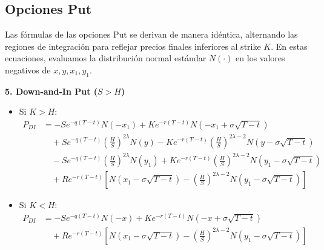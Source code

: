 \subsection{Opciones Put}

Las fórmulas de las opciones Put se derivan de manera idéntica, alternando las regiones de integración para reflejar precios finales inferiores al strike $K$. En estas ecuaciones, evaluamos la distribución normal estándar $N(\cdot)$ en los valores negativos de $x, y, x_1, y_1$.

\textbf{5. Down-and-In Put ($S > H$)}
\begin{itemize}
    \item Si $K > H$:
    \begin{align*}
    P_{DI} &= -S e^{-q(T-t)} N(-x_1) + K e^{-r(T-t)} N(-x_1 + \sigma\sqrt{T-t}) \\
    &\quad + S e^{-q(T-t)} \left(\frac{H}{S}\right)^{2\lambda} N(y) - K e^{-r(T-t)}\left(\frac{H}{S}\right)^{2\lambda - 2} N(y - \sigma\sqrt{T-t}) \\
    &\quad - S e^{-q(T-t)} \left(\frac{H}{S}\right)^{2\lambda} N(y_1) + K e^{-r(T-t)}\left(\frac{H}{S}\right)^{2\lambda - 2} N(y_1 - \sigma\sqrt{T-t}) \\
    &\quad + R e^{-r(T-t)} \left[ N(x_1 - \sigma \sqrt{T-t}) - \left(\frac{H}{S}\right)^{2\lambda - 2} N(y_1 - \sigma\sqrt{T-t}) \right]
    \end{align*}
    \item Si $K < H$:
    \begin{align*}
    P_{DI} &= -S e^{-q(T-t)} N(-x) + K e^{-r(T-t)} N(-x + \sigma\sqrt{T-t}) \\
    &\quad + R e^{-r(T-t)} \left[ N(x_1 - \sigma \sqrt{T-t}) - \left(\frac{H}{S}\right)^{2\lambda - 2} N(y_1 - \sigma\sqrt{T-t}) \right]
    \end{align*}
\end{itemize}


